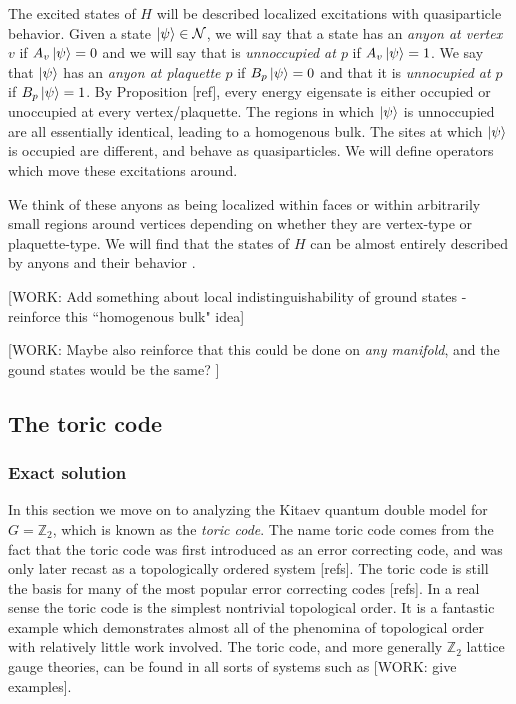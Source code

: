 \documentclass{article}
\theoremstyle{definition}
\newcommand{\ZZ}{\mathbb{Z}}
\newcommand{\NN}{\mathcal{N}}
\newcommand{\0}{\left|0\right>}
\newcommand{\1}{\left|1\right>}
\numberwithin{figure}{section}
\begin{document}
The excited states of $H$ will be described localized excitations with quasiparticle behavior. Given a state $\ket{\psi}\in \NN$, we will say that a state has an \textit{anyon at vertex $v$} if $A_v\ket{\psi}=0$ and we will say that is \textit{unnoccupied at $p$} if $A_v\ket{\psi}=1$. We say that $\ket{\psi}$ has an \textit{anyon at plaquette $p$} if $B_p\ket{\psi}=0$ and that it is \textit{unnocupied at $p$} if $B_p\ket{\psi}=1$. By Proposition [ref], every energy eigensate is either occupied or unoccupied at every vertex/plaquette. The regions in which $\ket{\psi}$ is unnoccupied are all essentially identical, leading to a homogenous bulk. The sites at which $\ket{\psi}$ is occupied are different, and behave as quasiparticles. We will define operators which move these excitations around.

We think of these anyons as being localized within faces or within arbitrarily small regions around vertices depending on whether they are vertex-type or plaquette-type. We will find that the states of $H$ can be almost entirely described by anyons and their behavior .

[WORK: Add something about local indistinguishability of ground states - reinforce this ``homogenous bulk" idea]

[WORK: Maybe also reinforce that this could be done on \textit{any manifold}, and the gound states would be the same? ]

\subsection{The toric code}

\subsubsection{Exact solution}

In this section we move on to analyzing the Kitaev quantum double model for $G=\ZZ_2$, which is known as the \textit{toric code}. The name toric code comes from the fact that the toric code was first introduced as an error correcting code, and was only later recast as a topologically ordered system [refs]. The toric code is still the basis for many of the most popular error correcting codes [refs]. In a real sense the toric code is the simplest nontrivial topological order. It is a fantastic example which demonstrates almost all of the phenomina of topological order with relatively little work involved. The toric code, and more generally $\ZZ_2$ lattice gauge theories, can be found in all sorts of systems such as [WORK: give examples]. 
\end{document}
